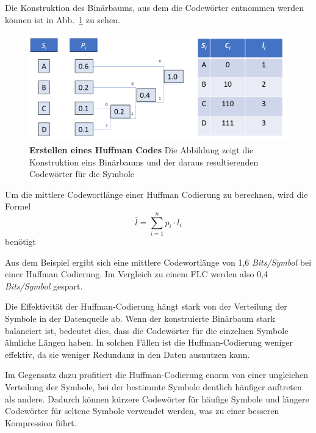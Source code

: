 Die Konstruktion des Binärbaums, aus dem die Codewörter entnommen werden können ist in Abb.~\ref{fig:huffman_example} zu sehen.

\begin{figure}[htb]
  \centering  
  \includegraphics[scale=0.4]{Bilder/Huffmancode_beispiel.png}
  \caption[Huffman Code Beispiel]{\textbf{Erstellen eines Huffman Codes} Die Abbildung zeigt die Konstruktion eins Binärbaums und der daraus resultierenden Codewörter für die Symbole}
  \label{fig:huffman_example}
\end{figure}

Um die mittlere Codewortlänge einer Huffman Codierung zu berechnen, wird die Formel
\begin{equation*}
\bar{l} = \sum_{i=1}^{n} p_i \cdot l_i
\end{equation*}
benötigt \newline

Aus dem Beispiel ergibt sich eine mittlere Codewortlänge von 1,6 \textit{Bits/Symbol} bei einer Huffman Codierung.
Im Vergleich zu einem FLC werden also 0,4 \textit{Bits/Symbol} gespart. \newline

Die Effektivität der Huffman-Codierung hängt stark von der Verteilung der Symbole in der Datenquelle ab. Wenn der konstruierte Binärbaum stark balanciert ist, bedeutet dies, dass die Codewörter für die einzelnen Symbole ähnliche Längen haben. In solchen Fällen ist die Huffman-Codierung weniger effektiv, da sie weniger Redundanz in den Daten ausnutzen kann.

Im Gegensatz dazu profitiert die Huffman-Codierung enorm von einer ungleichen Verteilung der Symbole, bei der bestimmte Symbole deutlich häufiger auftreten als andere. Dadurch können kürzere Codewörter für häufige Symbole und längere Codewörter für seltene Symbole verwendet werden, was zu einer besseren Kompression führt.

